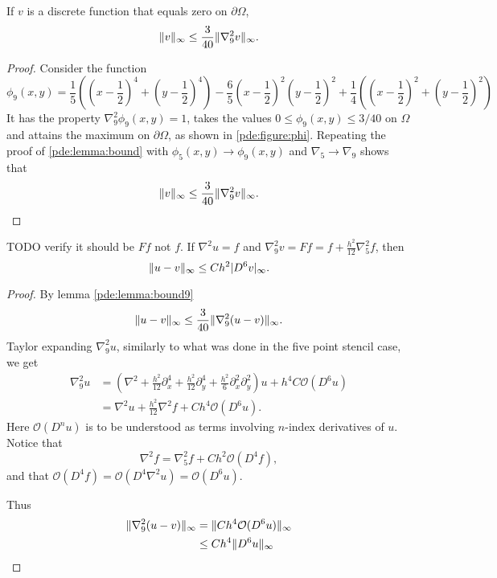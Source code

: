 \begin{lemma}\label{pde:lemma:bound9}
  If $v$ is a discrete function that equals zero on $\partial \Omega$,
  $$
  \lVert v \rVert_\infty \leq \frac{3}{40} \lVert \nabla_9^2 v \rVert_\infty.
  $$
\end{lemma}
\newcommand{\phinine}{\frac{1}{5} \left(\left(x-\frac{1}{2}\right)^4+\left(y-\frac{1}{2}\right)^4\right) - \frac{6}{5} \left(x-\frac{1}{2}\right)^2\left(y-\frac{1}{2}\right)^2 + \frac{1}{4} \left(\left(x-\frac{1}{2}\right)^2+\left(y-\frac{1}{2}\right)^2\right)}
\begin{proof}
  Consider the function
  \begin{equation}
  \phi_9(x,y) = \phinine
  \label{pde:equation:phi9}
  \end{equation}
  It has the property $\nabla_9^2 \phi_9(x,y) = 1$, takes the values $0 \leq \phi_9(x,y) \leq 3/40$ on $\Omega$ and attains the maximum on $\partial \Omega$, as shown in \cref{pde:figure:phi}.
  Repeating the proof of \cref{pde:lemma:bound} with $\phi_5(x,y) \rightarrow \phi_9(x,y)$ and $\nabla_5 \rightarrow \nabla_9$ shows that
  $$
  \lVert v \rVert_\infty
  \leq \frac{3}{40} \lVert \nabla_9^2 v \rVert_\infty.
  $$
\end{proof}

\begin{theorem}
TODO verify it should be $F f$ not $f$.
If $\nabla^2 u = f$ and $\nabla_9^2 v = F f = f + \frac{h^2}{12} \nabla_5^2 f$, then
$$
\lVert u - v \rVert_\infty \leq Ch^2 \lvert D^6 v\rvert_\infty.
$$
\end{theorem}
\begin{proof}
By lemma \ref{pde:lemma:bound9}
$$
\lVert u - v \rVert_\infty \leq \frac{3}{40} \lVert \nabla_9^2 (u  - v) \rVert_\infty.
$$
Taylor expanding $\nabla_9^2 u$, similarly to what was done in the five point stencil case, we get
\begin{align*}
  \nabla_9^2 u
  &= (\nabla^2
  + \frac{h^2}{12} \partial_x^4
  + \frac{h^2}{12} \partial_y^4
  + \frac{h^2}{6} \partial_x^2 \partial_y^2
  ) u + h^4 C \mathcal{O}(D^6 u)\\
  &= \nabla^2 u + \frac{h^2}{12} \nabla^2 f + C h^4 \mathcal{O}(D^6 u).
\end{align*}
Here $\mathcal{O}(D^n u)$ is to be understood as terms involving $n$-index derivatives of $u$.
Notice that
$$
\nabla^2 f = \nabla_5^2 f + C h^2 \mathcal{O}(D^4 f),
$$
and that $\mathcal{O}(D^4 f)
= \mathcal{O}(D^4 \nabla^2 u)
= \mathcal{O}(D^6 u)$.

Thus
\begin{align}
  \lVert \nabla_9^2 (u  - v) \rVert_\infty
  &= \lVert Ch^4 \mathcal{O}(D^6u) \rVert_\infty\\
  &\leq Ch^4 \lVert D^6u \rVert_\infty
\end{align}
\end{proof}




